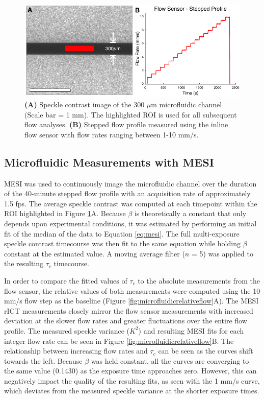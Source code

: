 \begin{figure}
    \includegraphics{figures/chapter_4/microfluidic.pdf}
    \caption{
        \label{fig:microfluidic}
        \textbf{(A)} Speckle contrast image of the 300 $\mu$m microfluidic channel (Scale bar = 1 mm). The highlighted ROI is used for all subsequent flow analyses. \textbf{(B)} Stepped flow profile measured using the inline flow sensor with flow rates ranging between 1-10 mm/s.
    }
\end{figure}

\subsection{Microfluidic Measurements with MESI}

MESI was used to continuously image the microfluidic channel over the duration of the 40-minute stepped flow profile with an acquisition rate of approximately 1.5 fps. The average speckle contrast was computed at each timepoint within the ROI highlighted in Figure \ref{fig:microfluidic}A. Because $\beta$ is theoretically a constant that only depends upon experimental conditions, it was estimated by performing an initial fit of the median of the data to Equation \ref{eq:mesi}. The full multi-exposure speckle contrast timecourse was then fit to the same equation while holding $\beta$ constant at the estimated value. A moving average filter ($n$ = 5) was applied to the resulting $\tau_c$ timecourse.

In order to compare the fitted values of $\tau_c$ to the absolute measurements from the flow sensor, the relative values of both measurements were computed using the 10 mm/s flow step as the baseline (Figure \ref{fig:microfluidicrelativeflow}A). The MESI rICT measurements closely mirror the flow sensor measurements with increased deviation at the slower flow rates and greater fluctuations over the entire flow profile. The measured speckle variance ($K^2$) and resulting MESI fits for each integer flow rate can be seen in Figure \ref{fig:microfluidicrelativeflow}B. The relationship between increasing flow rates and $\tau_c$ can be seen as the curves shift towards the left. Because $\beta$ was held constant, all the curves are converging to the same value (0.1430) as the exposure time approaches zero. However, this can negatively impact the quality of the resulting fits, as seen with the 1 mm/s curve, which deviates from the measured speckle variance at the shorter exposure times.

